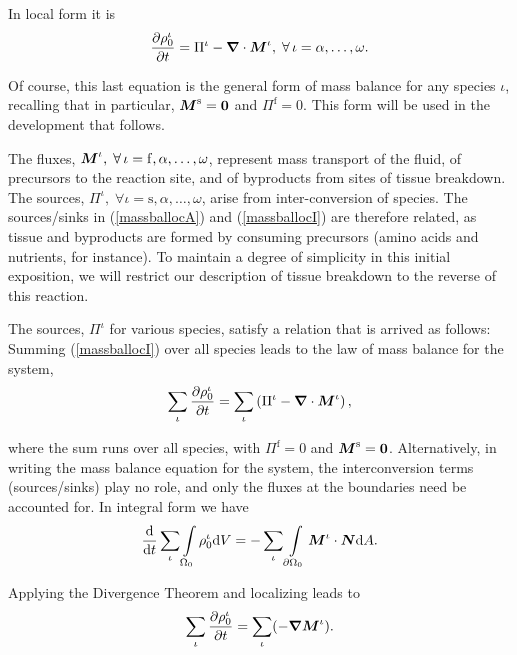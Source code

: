 \noindent In local form it is
\begin{equation}
\frac{\partial\rho_0^\iota}{\partial t} = \Pi^\iota -
\mbox{\boldmath$\nabla$}\cdot\mbox{\boldmath$ M$}^\iota,\;\forall\,\iota=\alpha,\dots,\omega.
\label{massballocI}
\end{equation}

\noindent Of course, this last equation is the general form of
mass balance for any species $\iota$, recalling that in
particular, $\mbox{\boldmath$ M$}^\mathrm{s} = {\bf 0}$ and $\Pi^\mathrm{f} = 0$.
This form will be used in the development that follows.

The fluxes,
$\mbox{\boldmath$ M$}^\iota,\;\forall\,\iota=\mathrm{f},\alpha,\dots,\omega$,
represent mass transport of the fluid, of precursors to the
reaction site, and of byproducts from sites of tissue breakdown.
The sources,
$\Pi^\iota,\;\forall\iota=\mathrm{s},\alpha,\dots,\omega$, arise
from inter-conversion of species. The sources/sinks in
(\ref{massballocA}) and (\ref{massballocI}) are therefore related,
as tissue and byproducts are formed by consuming precursors (amino
acids and nutrients, for instance). To maintain a degree of
simplicity in this initial exposition, we will restrict our
description of tissue breakdown to the reverse of this reaction.

The sources, $\Pi^\iota$ for various species, satisfy a relation
that is arrived as follows: Summing (\ref{massballocI}) over all
species leads to the law of mass balance for the system,
\begin{equation}
\sum\limits_\iota\frac{\partial\rho_0^\iota}{\partial t} =
\sum\limits_\iota\left(\Pi^\iota - \mbox{\boldmath$\nabla$}\cdot\mbox{\boldmath$ M$}^\iota\right),
\label{massballocItot}
\end{equation}

\noindent where the sum runs over all species, with
$\Pi^\mathrm{f} = 0$ and $\mbox{\boldmath$ M$}^\mathrm{s} = {\bf 0}$. Alternatively,
in writing the mass balance equation for the system, the
interconversion terms (sources/sinks) play no role, and only the
fluxes at the boundaries need be accounted for. In integral form
we have
\begin{displaymath}
\frac{\mathrm{d}}{\mathrm{d}t}\sum\limits_\iota\int\limits_{\Omega_0}\rho_0^\iota
\mathrm{d}V =
-\sum\limits_\iota\int\limits_{\partial\Omega_0}\mbox{\boldmath$ M$}^\iota\cdot\mbox{\boldmath$ N$}
\mathrm{d}A.
\end{displaymath}

\noindent Applying the Divergence Theorem and localizing leads to
\begin{equation}
\sum\limits_\iota \frac{\partial\rho_0^\iota}{\partial t} =
\sum\limits_\iota(-\mbox{\boldmath$\nabla$}\mbox{\boldmath$ M$}^\iota). \label{massballoctot}
\end{equation}

